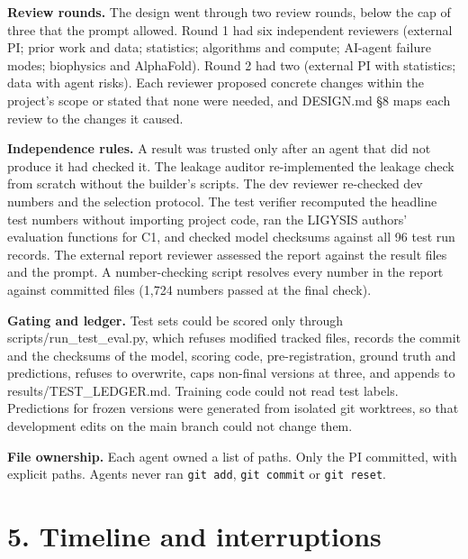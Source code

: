 \documentclass[10pt,letterpaper]{article}
\begin{document}
\textbf{Review rounds.} The design went through two review rounds, below the cap of three that the prompt allowed. Round 1 had six independent reviewers (external PI; prior work and data; statistics; algorithms and compute; AI-agent failure modes; biophysics and AlphaFold). Round 2 had two (external PI with statistics; data with agent risks). Each reviewer proposed concrete changes within the project's scope or stated that none were needed, and DESIGN.md §8 maps each review to the changes it caused.

\textbf{Independence rules.} A result was trusted only after an agent that did not produce it had checked it. The leakage auditor re-implemented the leakage check from scratch without the builder's scripts. The dev reviewer re-checked dev numbers and the selection protocol. The test verifier recomputed the headline test numbers without importing project code, ran the LIGYSIS authors' evaluation functions for C1, and checked model checksums against all 96 test run records. The external report reviewer assessed the report against the result files and the prompt. A number-checking script resolves every number in the report against committed files (1,724 numbers passed at the final check).

\textbf{Gating and ledger.} Test sets could be scored only through scripts/run\_test\_eval.py, which refuses modified tracked files, records the commit and the checksums of the model, scoring code, pre-registration, ground truth and predictions, refuses to overwrite, caps non-final versions at three, and appends to results/TEST\_LEDGER.md. Training code could not read test labels. Predictions for frozen versions were generated from isolated git worktrees, so that development edits on the main branch could not change them.

\textbf{File ownership.} Each agent owned a list of paths. Only the PI committed, with explicit paths. Agents never ran \texttt{git add}, \texttt{git commit} or \texttt{git reset}.

\section*{5. Timeline and interruptions}
\end{document}
